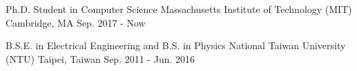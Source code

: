 \documentclass[12pt, a4paper]{awesome-cv}
\begin{document}
\makecvheader

\iffalse
\cvsection{Highlights}
\begin{cvskills}{0.7cm}{15.7cm}
    \cvskill{1}{\textbf{2} years in deep learning service deployment for Bite! APP with 40k users and 400k user images}
    \cvskill{2}{\textbf{2} majors acquired in undergraduate education: Electrical Engineering and Physics}
    \cvskill{3}{Ranked \textbf{\#1} in International Physics Olympiad 2011 in both theory and experiment among 400+ participants}
\end{cvskills}

\cvsection{Research Interests}
\begin{cvskills}{0.7cm}{15.7cm}
    \cvskill{1}{Deep Learning}
    \cvskill{2}{Computer Vision}
    \cvskill{3}{Machine Learning}
\end{cvskills}
\fi

\begin{cventries}
    \cventry
    {Ph.D. Student in Computer Science}
    {Massachusetts Institute of Technology (MIT)}
    {Cambridge, MA}
    {Sep. 2017 - Now}
    {}

    \cventry
    {B.S.E. in Electrical Engineering and B.S. in Physics}
    {National Taiwan University (NTU)}
    {Taipei, Taiwan}
    {Sep. 2011 - Jun. 2016}
    {
        \vspace{-3mm}
        \begin{cvskills}{2.7cm}{13.7cm}
            \iffalse
            \cvskill{Relevant courses}{
                {\bfseries Deep and Structured Machine Learning}, 
                {\bfseries Digital Visual Effects},
                Design and Analysis of Algorithms, 
                Data Structure and Programming, 
                Probability and Statistics, 
                Linear Algebra
            }
            \fi
        \end{cvskills}
    }
\end{cventries}
\vspace{-5mm}

\begin{cvskills}{2.2cm}{14.2cm}
    \iffalse
    \cvskill{Miscellaneous}{Beatbox, Mixology, Longboarding, Guitar}
    \fi
\end{cvskills}
\end{document}
